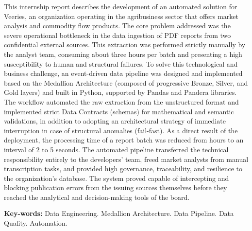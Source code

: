 This internship report describes the development of an automated solution for Veeries, an organization operating in the agribusiness sector that offers market analysis and commodity flow products. The core problem addressed was the severe operational bottleneck in the data ingestion of PDF reports from two confidential external sources. This extraction was performed strictly manually by the analyst team, consuming about three hours per batch and presenting a high susceptibility to human and structural failures. To solve this technological and business challenge, an event-driven data pipeline was designed and implemented based on the Medallion Architecture (composed of progressive Bronze, Silver, and Gold layers) and built in Python, supported by Pandas and Pandera libraries. The workflow automated the raw extraction from the unstructured format and implemented strict Data Contracts (schemas) for mathematical and semantic validations, in addition to adopting an architectural strategy of immediate interruption in case of structural anomalies (fail-fast). As a direct result of the deployment, the processing time of a report batch was reduced from hours to an interval of 2 to 5 seconds. The automated pipeline transferred the technical responsibility entirely to the developers' team, freed market analysts from manual transcription tasks, and provided high governance, traceability, and resilience to the organization's database. The system proved capable of intercepting and blocking publication errors from the issuing sources themselves before they reached the analytical and decision-making tools of the board.

\vspace{\onelineskip}
\noindent
\textbf{Key-words:} Data Engineering. Medallion Architecture. Data Pipeline. Data Quality. Automation.